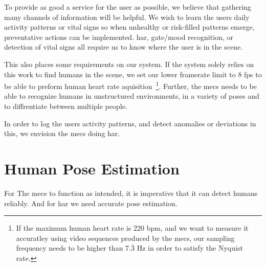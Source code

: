 To provide as good a service for the user as possible, we believe that gathering many channels of information will be helpful. We wish to learn the users daily activity patterns or vital signs so when unhealthy or risk-filled patterns emerge, preventative actions can be implemented. \gls{har}, gate/mood recognition, or detection of vital signs all require us to know where the user is in the scene.

This also places some requirements on our system. If the system solely relies on this work to find humans in the scene, we set our lower framerate limit to 8 fps to be able to preform human heart rate aquisition~\cite{Wu12Eulerian}\footnote{If the maximum human heart rate is 220 bpm, and we want to measure it accuratley using video sequences produced by the \gls{mecs}, our sampling frequency needs to be higher than $7.\overline{3}$ Hz in order to satisfy the Nyquist rate.}. Further, the \gls{mecs} needs to be able to recognize humans in unstructured environments, in a variety of poses and to diffrentiate between multiple people.

In order to log the users activity patterns, and detect anomalies or deviations in this, we envision the \gls{mecs} doing \gls{har}. 

\section{Human Pose Estimation}
For The \gls{mecs} to function as intended, it is imperative that it can detect humans reliably. And for \gls{har} we need accurate pose estimation. 
